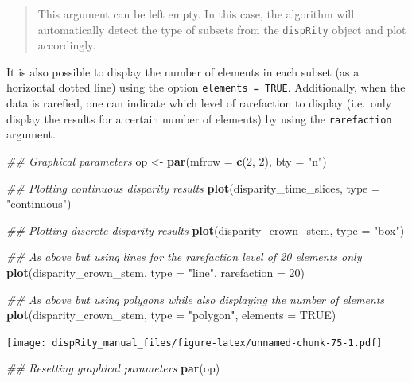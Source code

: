\documentclass[]{book}
\newenvironment{Shaded}{\begin{snugshade}}{\end{snugshade}}
\newcommand{\CommentTok}[1]{\textcolor[rgb]{0.56,0.35,0.01}{\textit{#1}}}
\newcommand{\DataTypeTok}[1]{\textcolor[rgb]{0.13,0.29,0.53}{#1}}
\newcommand{\DecValTok}[1]{\textcolor[rgb]{0.00,0.00,0.81}{#1}}
\newcommand{\KeywordTok}[1]{\textcolor[rgb]{0.13,0.29,0.53}{\textbf{#1}}}
\newcommand{\NormalTok}[1]{#1}
\newcommand{\OtherTok}[1]{\textcolor[rgb]{0.56,0.35,0.01}{#1}}
\newcommand{\StringTok}[1]{\textcolor[rgb]{0.31,0.60,0.02}{#1}}
\begin{document}
\begin{quote}
This argument can be left empty. In this case, the algorithm will automatically detect the type of subsets from the \texttt{dispRity} object and plot accordingly.
\end{quote}

It is also possible to display the number of elements in each subset (as a horizontal dotted line) using the option \texttt{elements\ =\ TRUE}.
Additionally, when the data is rarefied, one can indicate which level of rarefaction to display (i.e.~only display the results for a certain number of elements) by using the \texttt{rarefaction} argument.

\begin{Shaded}
\begin{Highlighting}[]
\CommentTok{## Graphical parameters}
\NormalTok{op <-}\StringTok{ }\KeywordTok{par}\NormalTok{(}\DataTypeTok{mfrow =} \KeywordTok{c}\NormalTok{(}\DecValTok{2}\NormalTok{, }\DecValTok{2}\NormalTok{), }\DataTypeTok{bty =} \StringTok{"n"}\NormalTok{)}

\CommentTok{## Plotting continuous disparity results}
\KeywordTok{plot}\NormalTok{(disparity_time_slices, }\DataTypeTok{type =} \StringTok{"continuous"}\NormalTok{)}

\CommentTok{## Plotting discrete disparity results}
\KeywordTok{plot}\NormalTok{(disparity_crown_stem, }\DataTypeTok{type =} \StringTok{"box"}\NormalTok{)}

\CommentTok{## As above but using lines for the rarefaction level of 20 elements only}
\KeywordTok{plot}\NormalTok{(disparity_crown_stem, }\DataTypeTok{type =} \StringTok{"line"}\NormalTok{, }\DataTypeTok{rarefaction =} \DecValTok{20}\NormalTok{)}

\CommentTok{## As above but using polygons while also displaying the number of elements}
\KeywordTok{plot}\NormalTok{(disparity_crown_stem, }\DataTypeTok{type =} \StringTok{"polygon"}\NormalTok{, }\DataTypeTok{elements =} \OtherTok{TRUE}\NormalTok{)}
\end{Highlighting}
\end{Shaded}

\texttt{[image: dispRity\_manual\_files/figure-latex/unnamed-chunk-75-1.pdf]}

\begin{Shaded}
\begin{Highlighting}[]
\CommentTok{## Resetting graphical parameters}
\KeywordTok{par}\NormalTok{(op)}
\end{Highlighting}
\end{Shaded}
\end{document}
